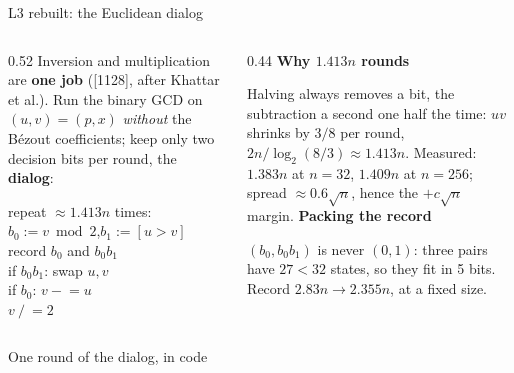 \documentclass[aspectratio=169,11pt]{beamer}
\newcommand{\blocktitle}[1]{{\bfseries #1}\par\vskip1mm}
\newcommand{\code}[2][]{}
\begin{document}
\setcounter{framenumber}{87}
\begin{frame}{L3 rebuilt: the Euclidean dialog}
  \begin{columns}[T]
    \begin{column}{0.52\textwidth}
      Inversion and multiplication are \textbf{one job} ([1128], after Khattar et al.). Run the binary GCD on $(u,v)=(p,x)$ \emph{without} the Bézout coefficients; keep only two decision bits per round, the \textbf{dialog}:
      \vskip1mm
      \begin{greyblock}[fontupper=\small]
        repeat $\approx1.413n$ times:\\
        \quad $b_0:=v\bmod2$,\quad $b_1:=[u>v]$\\
        \quad record $b_0$ and $b_0b_1$\\
        \quad if $b_0b_1$: swap $u,v$\\
        \quad if $b_0$: $v\mathrel{-}=u$\\
        \quad $v\mathrel{/}=2$
      \end{greyblock}
    \end{column}
    \begin{column}{0.44\textwidth}
      \small
      \blocktitle{Why $1.413n$ rounds}
      Halving always removes a bit, the subtraction a second one half the time: $uv$ shrinks by $3/8$ per round, $2n/\log_2(8/3)\approx1.413n$. Measured: $1.383n$ at $n=32$, $1.409n$ at $n=256$; spread $\approx0.6\sqrt n$, hence the $+c\sqrt n$ margin.
      \vskip2mm
      \blocktitle{Packing the record}
      $(b_0,b_0b_1)$ is never $(0,1)$: three pairs have $27<32$ states, so they fit in 5 bits. Record $2.83n\to2.355n$, at a fixed size.
    \end{column}
  \end{columns}
\end{frame}

\setcounter{framenumber}{88}
\begin{frame}[fragile]{One round of the dialog, in code}
  \code[basicstyle=\ttfamily\fontsize{7.6}{8.8}\selectfont]{dialog_round.py}
\end{frame}
\end{document}
